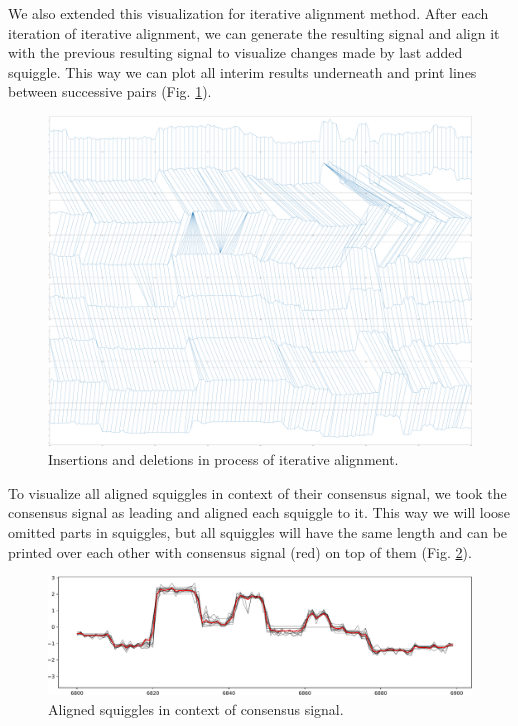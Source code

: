 We also extended this visualization for iterative alignment method. 
After each iteration of iterative alignment, we can generate the resulting signal and align it with the previous resulting signal to visualize
changes made by last added squiggle. This way we can plot all interim results underneath and print lines between successive pairs (Fig. \ref{fig:pairings}).


\begin{figure}[h]
  \centering
  \includegraphics[width=1.0\textwidth]{images/pairings}
  \caption{Insertions and deletions in process of iterative alignment.}
  \label{fig:pairings}
\end{figure}

To visualize all aligned squiggles in context of their consensus signal, we took the consensus signal as leading and aligned each squiggle to it.
This way we will loose omitted parts in squiggles, but all squiggles will have the same length and can be printed over each other with consensus signal (red) on top of them (Fig. \ref{fig:foos}).

\begin{figure}[h]
  \centering
  \includegraphics[width=1.0\textwidth]{images/foos}
  \caption{Aligned squiggles in context of consensus signal.}
  \label{fig:foos}
\end{figure}